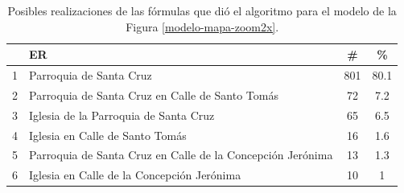 




\begin{table}[H]
\begin{center}
\begin{tabular}{|l|l|c|c|}
\hline
&ER			      &  \# &\% \\ \hline \hline
1& Parroquia de Santa Cruz& 801&80.1\\ \hline
2& Parroquia de Santa Cruz en Calle de Santo Tom\'as& 72&7.2\\ \hline
3& Iglesia de la Parroquia de Santa Cruz& 65&6.5\\ \hline
4& Iglesia en Calle de Santo Tom\'as&16&1.6\\ \hline
5& Parroquia de Santa Cruz en Calle de la Concepci\'on Jer\'onima& 13&1.3\\ \hline
6& Iglesia en Calle de la Concepci\'on Jer\'onima &10&1\\ \hline


\end{tabular}

\caption{Posibles realizaciones de las f\'ormulas que di\'o el algoritmo para el modelo de la Figura \protect\ref{modelo-mapa-zoom2x}.}\label{formulas-mapa-zoom2x}
\end{center}
\end{table}

